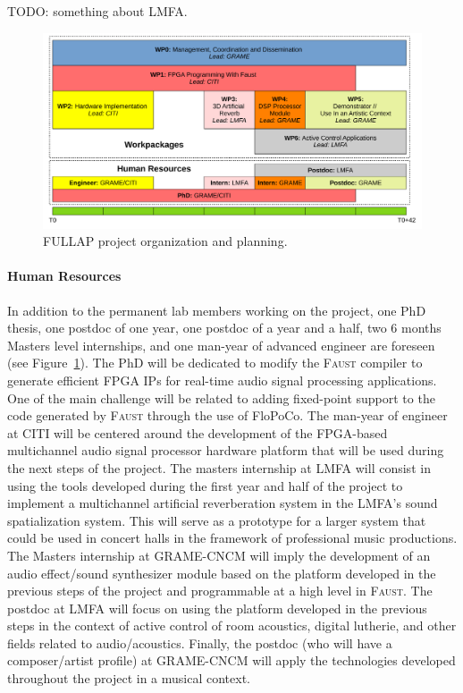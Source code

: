\documentclass[a4paper,10pt]{article}
\newcommand{\F}{\textsc{Faust}}
\newcommand{\PP}{FULLAP}
\begin{document}
TODO: something about LMFA.

\begin{figure}[h]
  \centering
  \includegraphics[width=\columnwidth]{img/wp}
  \caption{\PP{} project organization and planning.}
  \label{fig:wp}
\end{figure}

\paragraph{Human Resources}

In addition to the permanent lab members working on the project, one PhD thesis, one postdoc of one year, one postdoc of a year and a half, two 6 months Masters level internships, and one man-year of advanced engineer are foreseen (see Figure~\ref{fig:wp}). The PhD will be dedicated to modify the \F{} compiler to generate efficient FPGA IPs for real-time audio signal processing applications. One of the main challenge will be related to adding fixed-point support to the code generated by \F{} through the use of FloPoCo. The man-year of engineer at CITI will be centered around the development of the FPGA-based multichannel audio signal processor hardware platform that will be used during the next steps of the project. The masters internship at LMFA will consist in using the tools developed during the first year and half of the project to implement a multichannel artificial reverberation system in the LMFA's sound spatialization system. This will serve as a prototype for a larger system that could be used in concert halls in the framework of professional music productions. The Masters internship at GRAME-CNCM will imply the development of an audio effect/sound synthesizer module based on the platform developed in the previous steps of the project and programmable at a high level in \F{}. The postdoc at LMFA will focus on using the platform developed in the previous steps in the context of active control of room acoustics, digital lutherie, and other fields related to audio/acoustics. Finally, the postdoc (who will have a composer/artist profile) at GRAME-CNCM will apply the technologies developed throughout the project in a musical context.
\end{document}

